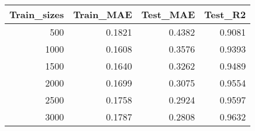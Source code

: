 \begin{tabular}{rrrr}
\toprule
Train_sizes & Train_MAE & Test_MAE & Test_R2 \\
\midrule
500 & 0.1821 & 0.4382 & 0.9081 \\
1000 & 0.1608 & 0.3576 & 0.9393 \\
1500 & 0.1640 & 0.3262 & 0.9489 \\
2000 & 0.1699 & 0.3075 & 0.9554 \\
2500 & 0.1758 & 0.2924 & 0.9597 \\
3000 & 0.1787 & 0.2808 & 0.9632 \\
\bottomrule
\end{tabular}
